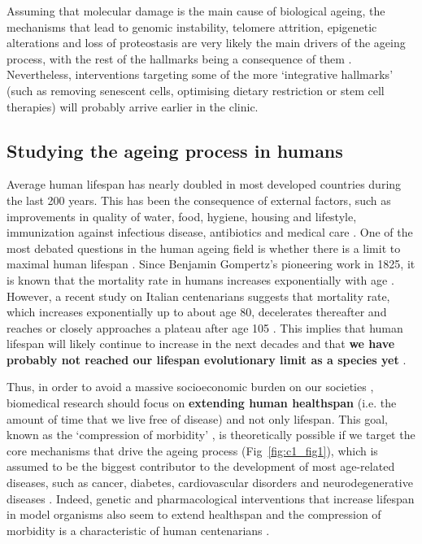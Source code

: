 \bigskip

Assuming that molecular damage is the main cause of biological ageing, the mechanisms that lead to genomic instability, telomere attrition, epigenetic alterations and loss of proteostasis are very likely the main drivers of the ageing process, with the rest of the hallmarks being a consequence of them \cite{Lopez-Otin2013}. Nevertheless, interventions targeting some of the more `integrative hallmarks' (such as removing senescent cells, optimising dietary restriction or stem cell therapies) will probably arrive earlier in the clinic.

\smallskip

\subsection{Studying the ageing process in humans}

\smallskip

Average human lifespan has nearly doubled in most developed countries during the last 200 years. This has been the consequence of external factors, such as improvements in quality of water, food, hygiene, housing and lifestyle, immunization against infectious disease, antibiotics and medical care \cite{Partridge2018}. One of the most debated questions in the human ageing field is whether there is a limit to maximal human lifespan \cite{Dong2016}. Since Benjamin Gompertz's pioneering work in 1825, it is known that the mortality rate in humans increases exponentially with age \cite{Gompertz1825}. However, a recent study on Italian centenarians suggests that mortality rate, which increases exponentially up to about age 80, decelerates thereafter and reaches or closely approaches a plateau after age 105 \cite{Barbi2018}. This implies that human lifespan will likely continue to increase in the next decades and that \textbf{we have probably not reached our lifespan evolutionary limit as a species yet} \cite{Barbi2018,Kontis2017}. 

\bigskip

Thus, in order to avoid a massive socioeconomic burden on our societies \cite{Fine2014}, biomedical research should focus on \textbf{extending human healthspan} (i.e. the amount of time that we live free of disease) and not only lifespan. This goal, known as the `compression of morbidity' \cite{Partridge2018}, is theoretically possible if we target the core mechanisms that drive the ageing process (Fig~\ref{fig:c1_fig1}), which is assumed to be the biggest contributor to the development of most age-related diseases, such as cancer, diabetes, cardiovascular disorders and neurodegenerative diseases \cite{Lopez-Otin2013}. Indeed, genetic and pharmacological interventions that increase lifespan in model organisms also seem to extend healthspan \cite{NewellStamper2018} and the compression of morbidity is a characteristic of human centenarians \cite{Feldman2012}.  

